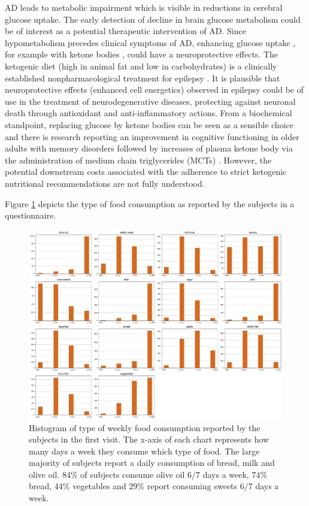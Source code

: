 \documentclass[11pt]{article}
\theoremstyle{definition}
\theoremstyle{remark}
\begin{document}
AD leads to metabolic impairment which is visible in reductions in cerebral glucose uptake. The early detection of decline in brain glucose metabolism could be of interest as a potential therapeutic intervention of AD. Since hypometabolism precedes clinical symptoms of AD, enhancing glucose uptake \cite{duran2016glucose}, for example with ketone bodies \cite{gasior2006neuroprotective}, could have a neuroprotective effects. The ketogenic diet (high in animal fat and low in carbohydrates) is a clinically established nonpharmacological treatment for epilepsy \cite{vining1998multicenter}. It is plausible that neuroprotective effects (enhanced cell energetics) observed in epilepsy could be of use in the treatment of neurodegenerative diseases, protecting against neuronal death through antioxidant and anti-inflammatory actions. From a biochemical standpoint, replacing glucose by ketone bodies can be seen as a sensible choice and there is research reporting an improvement in cognitive functioning in older adults with memory disorders followed by increases of plasma ketone body via the administration of medium chain triglycerides (MCTs) \cite{reger2004effects}. However, the potential downstream costs associated with the adherence to strict ketogenic nutritional recommendations are not fully understood. 

Figure \ref{fig:food} depicts the type of food consumption as reported by the subjects in a questionnaire.

\begin{figure}[H]
        \centering
        \includegraphics[keepaspectratio, width=\linewidth]{figures/Fig_food}
        \caption{Histogram of type of weekly food consumption reported by the subjects in the first visit. The x-axis of each chart represents how many days a week they consume which type of food. The large majority of subjects report a daily consumption of bread, milk and olive oil. $84\%$ of subjects consume olive oil $6/7$ days a week, $74\%$ bread, $44\%$ vegetables and $29\%$ report consuming sweets $6/7$ days a week.}
        \label{fig:food}
\end{figure}
\end{document}
